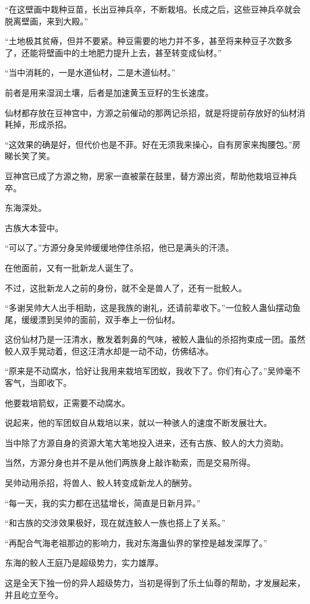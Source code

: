 \begin{this_body}
“在这壁画中栽种豆苗，长出豆神兵卒，不断栽培。长成之后，这些豆神兵卒就会脱离壁画，来到大殿。”

“土地极其贫瘠，但并不要紧。种豆需要的地力并不多，甚至将来种豆子次数多了，还能将壁画中的土地肥力提升上去，甚至转变成仙材。”

“当中消耗的，一是水道仙材，二是木道仙材。”

前者是用来湿润土壤，后者是加速黄玉豆籽的生长速度。

仙材都存放在豆神宫中，方源之前催动的那两记杀招，就是将提前存放好的仙材消耗掉，形成杀招。

“这效果的确是好，但代价也是不菲。好在无须我来操心，自有房家来掏腰包。”房睇长笑了笑。

豆神宫已成了方源之物，房家一直被蒙在鼓里，替方源出资，帮助他栽培豆神兵卒。

东海深处。

古族大本营中。

“可以了。”方源分身吴帅缓缓地停住杀招，他已是满头的汗渍。

在他面前，又有一批新龙人诞生了。

不过，这批新龙人之前的身份，就不全是兽人了，还有一批鲛人。

“多谢吴帅大人出手相助，这是我族的谢礼，还请前辈收下。”一位鲛人蛊仙摆动鱼尾，缓缓漂到吴帅的面前，双手奉上一份仙材。

这份仙材乃是一汪清水，散发着刺鼻的气味，被鲛人蛊仙的杀招拘束成一团。虽然鲛人双手晃动着，但这汪清水却是一动不动，仿佛结冰。

“原来是不动腐水，恰好让我用来栽培军团蚁，我收下了。你们有心了。”吴帅毫不客气，当即收下。

他要栽培箭蚁，正需要不动腐水。

说起来，他的军团蚁自从栽培以来，就以一种骇人的速度不断发展壮大。

当中除了方源自身的资源大笔大笔地投入进来，还有古族、鲛人的大力资助。

当然，方源分身也并不是从他们两族身上敲诈勒索，而是交易所得。

吴帅动用杀招，将兽人、鲛人转变成新龙人的酬劳。

“每一天，我的实力都在迅猛增长，简直是日新月异。”

“和古族的交涉效果极好，现在就连鲛人一族也搭上了关系。”

“再配合气海老祖那边的影响力，我对东海蛊仙界的掌控是越发深厚了。”

东海的鲛人王庭乃是超级势力，实力雄厚。

这是全天下独一份的异人超级势力，当初是得到了乐土仙尊的帮助，才发展起来，并且屹立至今。


\end{this_body}
